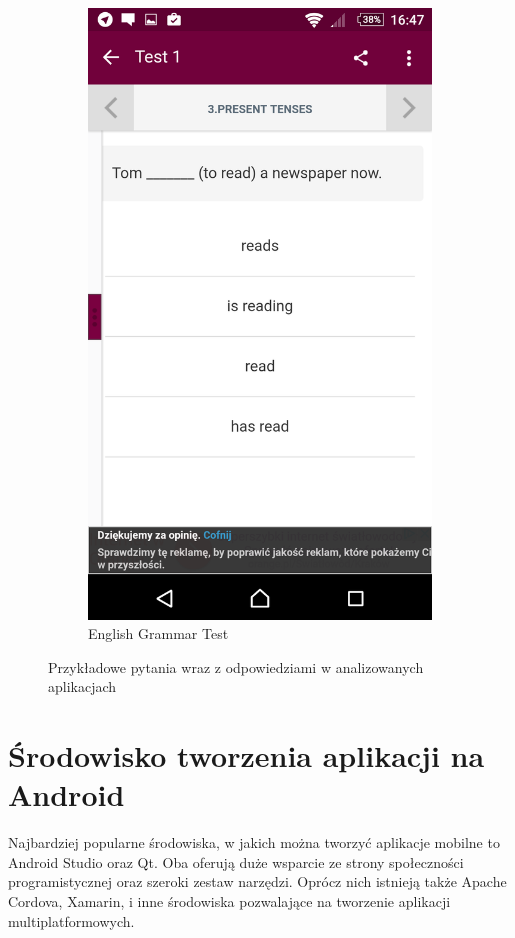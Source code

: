 \documentclass[eng]{mgr}
\begin{document}
\begin{figure}[ht]
\begin{subfigure}{.32\textwidth}
				\includegraphics[width=.9\linewidth]{English_Grammar_Test.png}
				\caption{English Grammar Test}
				\label{fig:english_grammar_test}
			\end{subfigure}
			\caption{Przykładowe pytania wraz z odpowiedziami w analizowanych aplikacjach}
			\label{fig:przykladowe_aplikacje}
		\end{figure}
	
		\section{Środowisko tworzenia aplikacji na Android}
		Najbardziej popularne środowiska, w jakich można tworzyć aplikacje mobilne to Android Studio oraz Qt. Oba oferują duże wsparcie ze strony społeczności programistycznej oraz szeroki zestaw narzędzi. Oprócz nich istnieją także Apache Cordova, Xamarin, i inne środowiska pozwalające na tworzenie aplikacji multiplatformowych.
		
\end{document}
